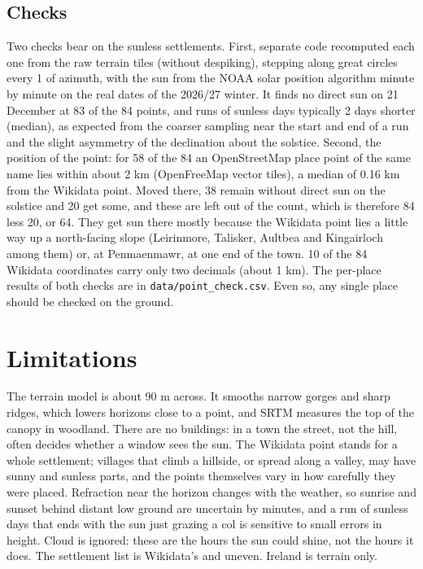 \documentclass[11pt,a4paper]{article}
\begin{document}
\subsection{Checks}\label{sec:check}
Two checks bear on the sunless settlements. First, separate code recomputed each one from the raw terrain tiles (without despiking), stepping along great circles every 1\textdegree{} of azimuth, with the sun from the NOAA solar position algorithm minute by minute on the real dates of the 2026/27 winter. It finds no direct sun on 21 December at 83 of the 84 points, and runs of sunless days typically 2 days shorter (median), as expected from the coarser sampling near the start and end of a run and the slight asymmetry of the declination about the solstice. Second, the position of the point: for 58 of the 84 an OpenStreetMap place point of the same name lies within about 2 km (OpenFreeMap vector tiles), a median of 0.16 km from the Wikidata point. Moved there, 38 remain without direct sun on the solstice and 20 get some, and these are left out of the count, which is therefore 84 less 20, or 64. They get sun there mostly because the Wikidata point lies a little way up a north-facing slope (Leirinmore, Talisker, Aultbea and Kingairloch among them) or, at Penmaenmawr, at one end of the town. 10 of the 84 Wikidata coordinates carry only two decimals (about 1 km). The per-place results of both checks are in \texttt{data/point\_check.csv}. Even so, any single place should be checked on the ground.

\section{Limitations}\label{sec:limits}
The terrain model is about 90 m across. It smooths narrow gorges and sharp ridges, which lowers horizons close to a point, and SRTM measures the top of the canopy in woodland. There are no buildings: in a town the street, not the hill, often decides whether a window sees the sun. The Wikidata point stands for a whole settlement; villages that climb a hillside, or spread along a valley, may have sunny and sunless parts, and the points themselves vary in how carefully they were placed. Refraction near the horizon changes with the weather, so sunrise and sunset behind distant low ground are uncertain by minutes, and a run of sunless days that ends with the sun just grazing a col is sensitive to small errors in height. Cloud is ignored: these are the hours the sun could shine, not the hours it does. The settlement list is Wikidata's and uneven. Ireland is terrain only.
\end{document}
